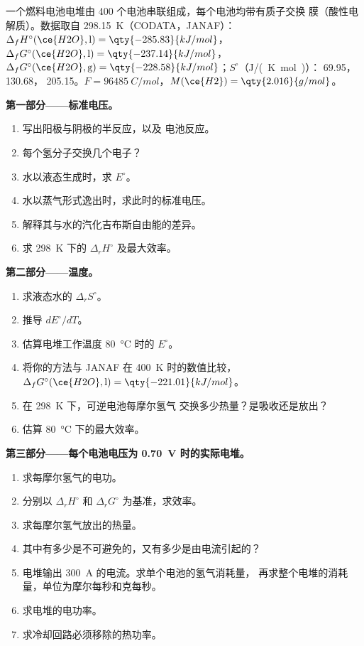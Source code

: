 \begin{problem}
\label{pb:b2:cell-thermodynamics:1}
一个燃料电池电堆由 400 个电池串联组成，每个电池均带有质子交换
膜（酸性电解质）。数据取自 \qty{298.15}{K}（CODATA，JANAF）：
$\Delta_f H^\circ(\ce{H2O}, \text{l}) = \qty{-285.83}{kJ/mol}$，$\Delta_f
G^\circ(\ce{H2O}, \text{l}) = \qty{-237.14}{kJ/mol}$，$\Delta_f G^\circ(\ce{H2O},
\text{g}) = \qty{-228.58}{kJ/mol}$；$S^\circ$（\unit{J/(K.mol)}）： 69.95，
 130.68， 205.15。$F = \qty{96485}{C/mol}$，$M(\ce{H2}) =
\qty{2.016}{g/mol}$。

\medskip
\noindent\textbf{第一部分——标准电压。}
\begin{enumerate}
  \item 写出阳极与阴极的半反应，以及
        电池反应。
  \item 每个氢分子交换几个电子？
  \item 水以液态生成时，求 $E^\circ$。
  \item 水以蒸气形式逸出时，求此时的标准电压。
  \item 解释其与水的汽化吉布斯自由能的差异。
  \item 求 \qty{298}{K} 下的 $\Delta_r H^\circ$ 及最大效率。
\end{enumerate}

\medskip
\noindent\textbf{第二部分——温度。}
\begin{enumerate}[resume]
  \item 求液态水的 $\Delta_r S^\circ$。
  \item 推导 $dE^\circ/dT$。
  \item 估算电堆工作温度 \qty{80}{\degreeCelsius} 时的
        $E^\circ$。
  \item 将你的方法与 JANAF 在 \qty{400}{K} 时的数值比较，$\Delta_f
        G^\circ(\ce{H2O}, \text{l}) = \qty{-221.01}{kJ/mol}$。
  \item 在 \qty{298}{K} 下，可逆电池每摩尔氢气
        交换多少热量？是吸收还是放出？
  \item 估算 \qty{80}{\degreeCelsius} 下的最大效率。
\end{enumerate}

\medskip
\noindent\textbf{第三部分——每个电池电压为 \qty{0.70}{V} 时的实际电堆。}
\begin{enumerate}[resume]
  \item 求每摩尔氢气的电功。
  \item 分别以 $\Delta_r H^\circ$ 和 $\Delta_r G^\circ$ 为基准，求效率。
  \item 求每摩尔氢气放出的热量。
  \item 其中有多少是不可避免的，又有多少是由电流引起的？
  \item 电堆输出 \qty{300}{A} 的电流。求单个电池的氢气消耗量，
        再求整个电堆的消耗量，单位为摩尔每秒和克每秒。
  \item 求电堆的电功率。
  \item 求冷却回路必须移除的热功率。
\end{enumerate}


\end{problem}
